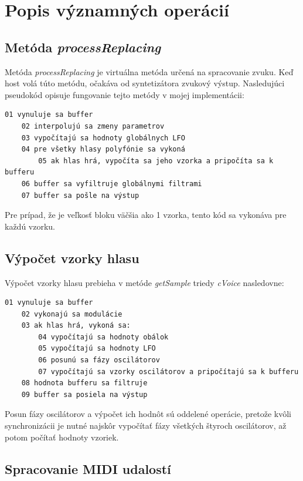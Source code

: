 \section{Popis významných operácií}

\subsection{Metóda \emph{processReplacing}}

Metóda \emph{processReplacing} je virtuálna metóda určená na spracovanie zvuku. Keď host volá túto metódu, očakáva od syntetizátora zvukový výstup.
Nasledujúci pseudokód opisuje fungovanie tejto metódy v mojej implementácii:

\begin{Verbatim}[fontsize=\relsize{-1.5}]
	01 vynuluje sa buffer
	02 interpolujú sa zmeny parametrov
	03 vypočítajú sa hodnoty globálnych LFO
	04 pre všetky hlasy polyfónie sa vykoná
		05 ak hlas hrá, vypočíta sa jeho vzorka a pripočíta sa k bufferu
	06 buffer sa vyfiltruje globálnymi filtrami
	07 buffer sa pošle na výstup
\end{Verbatim}

Pre prípad, že je veľkosť bloku väčšia ako 1 vzorka, tento kód sa vykonáva pre každú vzorku.

\subsection{Výpočet vzorky hlasu}

Výpočet vzorky hlasu prebieha v metóde \emph{getSample} triedy \emph{cVoice} nasledovne:

\begin{Verbatim}[fontsize=\relsize{-1.5}]
	01 vynuluje sa buffer
	02 vykonajú sa modulácie
	03 ak hlas hrá, vykoná sa:
		04 vypočítajú sa hodnoty obálok
		05 vypočítajú sa hodnoty LFO
		06 posunú sa fázy oscilátorov
		07 vypočítajú sa vzorky oscilátorov a pripočítajú sa k bufferu
	08 hodnota bufferu sa filtruje
	09 buffer sa posiela na výstup	
\end{Verbatim}

Posun fázy oscilátorov a výpočet ich hodnôt sú oddelené operácie, pretože kvôli synchronizácii je nutné najskôr vypočítať fázy všetkých štyroch oscilátorov, až potom počítať hodnoty vzoriek.

\subsection{Spracovanie MIDI udalostí}

